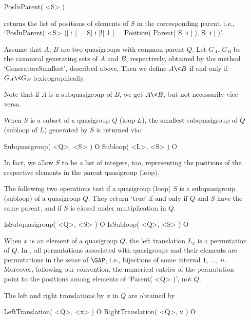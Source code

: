 \>PosInParent( <S> )

returns the list of positions of elements of $S$ in the corresponding parent,
i.e., `PosInParent( <S> )[ i ] = S[ i ]![ 1 ] = Position( Parent( S[ i ] ), S[
i ] )'.


\noindent Assume that $A$, $B$ are two quasigroups with common parent $Q$. Let
$G_A$, $G_B$ be the canonical generating sets of $A$ and $B$, respectively,
obtained by the method `GeneratorsSmallest', described above. Then we
define $A \< B$ if and only if $G_A \< G_B$ lexicographically.

Note that if $A$ is a subquasigroup of $B$, we get $A\<B$, but not necessarily
vice versa.



When $S$ is a subset of a quasigroup $Q$ (loop $L$), the smallest subquasigroup
of $Q$ (subloop of $L$) generated by $S$ is returned via:

\>Subquasigroup( <Q>, <S> ) O
\>Subloop( <L>, <S> ) O

In fact, we allow $S$ to be a list of integers, too, representing the positions
of the respective elements in the parent quasigroup (loop).

The following two operations test if a quasigroup (loop) $S$ is a subquasigroup
(subloop) of a quasigroup $Q$. They return `true' if and only if $Q$ and $S$
have the same parent, and if $S$ is closed under multiplication in $Q$.

\>IsSubquasigroup( <Q>, <S> ) O
\>IsSubloop( <Q>, <S> ) O


When $x$ is an element of a quasigroup $Q$, the left translation $L_x$ is a
permutation of $Q$. In {\LOOPS}, all permutations associated with quasigroups
and their elements are permutations in the sense of ${\GAP}$, i.e., bijections
of some interval $1$, $\dots$, $n$. Moreover, following our convention, the
numerical entries of the permutation point to the positions among elements of
`Parent( <Q> )', not $Q$.

The left and right translations by $x$ in $Q$ are obtained by

\>LeftTranslation( <Q>, <x> ) O
\>RightTranslation( <Q>, x ) O

